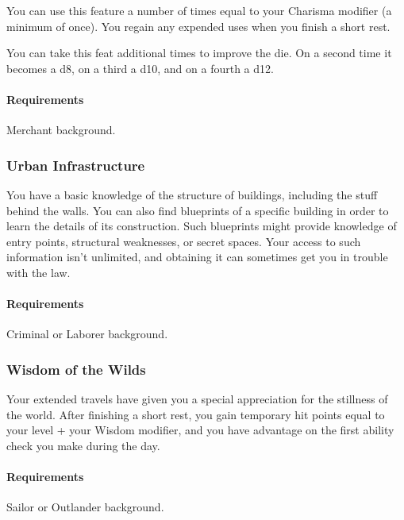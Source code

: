     You can use this feature a number of times equal to your Charisma modifier (a minimum of once).
    You regain any expended uses when you finish a short rest.

    You can take this feat additional times to improve the die.
    On a second time it becomes a d8, on a third a d10, and on a fourth a d12.
    \paragraph{Requirements} Merchant background.
\subsubsection{Urban Infrastructure} \label{feat::urbaninfrastructure}
    You have a basic knowledge of the structure of buildings, including the stuff behind the walls.
    You can also find blueprints of a specific building in order to learn the details of its construction.
    Such blueprints might provide knowledge of entry points, structural weaknesses, or secret spaces.
    Your access to such information isn't unlimited, and obtaining it can sometimes get you in trouble with the law.
    \paragraph{Requirements} Criminal or Laborer background.
\subsubsection{Wisdom of the Wilds} \label{feat::wisdomofthewilds}
    Your extended travels have given you a special appreciation for the stillness of the world.
    After finishing a short rest, you gain temporary hit points equal to your level + your Wisdom modifier, and you have advantage on the first ability check you make during the day.
    \paragraph{Requirements} Sailor or Outlander background.

